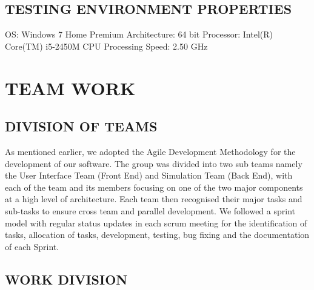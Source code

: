 \documentclass[11pt,a4paper]{article}
\begin{document}
\subsection{TESTING ENVIRONMENT PROPERTIES}

OS: Windows 7 Home Premium\newline
Architecture: 64 bit\newline
Processor: Intel(R) Core(TM) i5-2450M\newline
CPU Processing Speed: 2.50 GHz\newline

\section{TEAM WORK}

\subsection{DIVISION OF TEAMS}

As mentioned earlier, we adopted the Agile Development Methodology for the development of our software. The group was divided into two sub teams namely the User Interface Team (Front End) and Simulation Team (Back End), with each of the team and its members focusing on one of the two major components at a high level of architecture. Each team then recognised their major tasks and sub-tasks to ensure cross team and parallel development. We followed a sprint model with regular status updates in each scrum meeting for the identification of tasks, allocation of tasks, development, testing, bug fixing and the documentation of each Sprint.

\subsection{WORK DIVISION}
\end{document}
